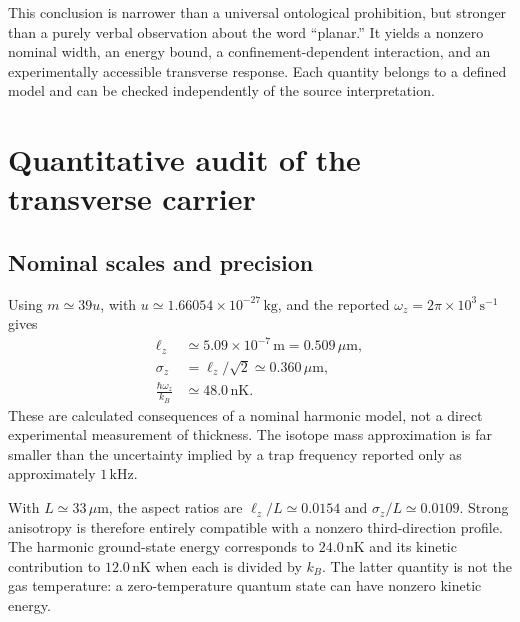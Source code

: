 \documentclass[11pt,a4paper]{article}
\theoremstyle{definition}
\theoremstyle{remark}
\newcommand{\lop}{\ell_z}
\begin{document}
This conclusion is narrower than a universal ontological prohibition, but stronger than a purely verbal observation about the word ``planar.'' It yields a nonzero nominal width, an energy bound, a confinement-dependent interaction, and an experimentally accessible transverse response. Each quantity belongs to a defined model and can be checked independently of the source interpretation.

\section{Quantitative audit of the transverse carrier}
\label{sec:numerics}
\subsection{Nominal scales and precision}
Using $m\simeq39u$, with $u\simeq1.66054\times10^{-27}\,\mathrm{kg}$, and the reported $\omega_z=2\pi\times10^3\,\mathrm{s}^{-1}$ gives
\begin{align}
 \lop&\simeq5.09\times10^{-7}\,\mathrm m
          =0.509\,\mu\mathrm m,\nonumber\\
 \sigma_z&=\lop/\sqrt2\simeq0.360\,\mu\mathrm m,\nonumber\\
 \frac{\hbar\omega_z}{k_B}&\simeq48.0\,\mathrm{nK}.
 \label{eq:numeric_width}
\end{align}
These are calculated consequences of a nominal harmonic model, not a direct experimental measurement of thickness. The isotope mass approximation is far smaller than the uncertainty implied by a trap frequency reported only as approximately $1\,\mathrm{kHz}$.\cite{zhang2026}

With $L\simeq33\,\mu\mathrm m$, the aspect ratios are $\lop/L\simeq0.0154$ and $\sigma_z/L\simeq0.0109$. Strong anisotropy is therefore entirely compatible with a nonzero third-direction profile. The harmonic ground-state energy corresponds to $24.0\,\mathrm{nK}$ and its kinetic contribution to $12.0\,\mathrm{nK}$ when each is divided by $k_B$. The latter quantity is not the gas temperature: a zero-temperature quantum state can have nonzero kinetic energy.\cite{zhang2026}
\end{document}
